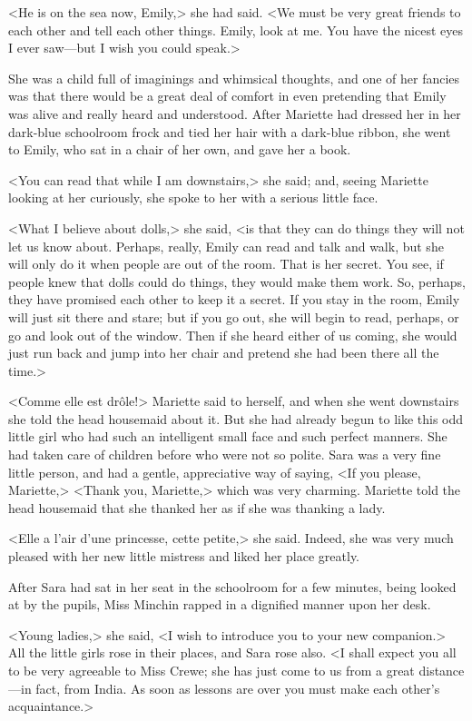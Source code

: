 <He is on the sea now, Emily,> she had said. <We must be very great friends to each other and tell each other things. Emily, look at me. You have the nicest eyes I ever saw—but I wish you could speak.>

She was a child full of imaginings and whimsical thoughts, and one of her fancies was that there would be a great deal of comfort in even pretending that Emily was alive and really heard and understood. After Mariette had dressed her in her dark-blue schoolroom frock and tied her hair with a dark-blue ribbon, she went to Emily, who sat in a chair of her own, and gave her a book.

<You can read that while I am downstairs,> she said; and, seeing Mariette looking at her curiously, she spoke to her with a serious little face.

<What I believe about dolls,> she said, <is that they can do things they will not let us know about. Perhaps, really, Emily can read and talk and walk, but she will only do it when people are out of the room. That is her secret. You see, if people knew that dolls could do things, they would make them work. So, perhaps, they have promised each other to keep it a secret. If you stay in the room, Emily will just sit there and stare; but if you go out, she will begin to read, perhaps, or go and look out of the window. Then if she heard either of us coming, she would just run back and jump into her chair and pretend she had been there all the time.>

<\textfrench{Comme elle est drôle!}> Mariette said to herself, and when she went downstairs she told the head housemaid about it. But she had already begun to like this odd little girl who had such an intelligent small face and such perfect manners. She had taken care of children before who were not so polite. Sara was a very fine little person, and had a gentle, appreciative way of saying, <If you please, Mariette,> <Thank you, Mariette,> which was very charming. Mariette told the head housemaid that she thanked her as if she was thanking a lady.

<\textfrench{Elle a l'air d'une princesse, cette petite,}> she said. Indeed, she was very much pleased with her new little mistress and liked her place greatly.

After Sara had sat in her seat in the schoolroom for a few minutes, being looked at by the pupils, Miss Minchin rapped in a dignified manner upon her desk.

<Young ladies,> she said, <I wish to introduce you to your new companion.> All the little girls rose in their places, and Sara rose also. <I shall expect you all to be very agreeable to Miss Crewe; she has just come to us from a great distance—in fact, from India. As soon as lessons are over you must make each other's acquaintance.>

